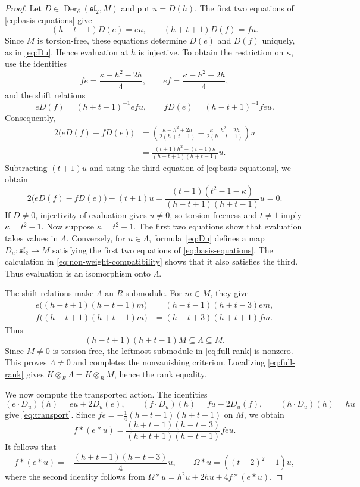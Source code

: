 \documentclass[11pt,reqno]{amsart}
\numberwithin{equation}{section}
\newcommand{\s}{\mathfrak{sl}_2}
\DeclareMathOperator{\Der}{Der}
\theoremstyle{definition}
\theoremstyle{remark}
\begin{document}
\begin{proof}
Let \(D\in\Der_\delta(\s,M)\) and put \(u=D(h)\).
The first two equations of \eqref{eq:basis-equations} give
\[
(h-t-1)D(e)=eu,\qquad (h+t+1)D(f)=fu.
\]
Since \(M\) is torsion-free, these equations determine
\(D(e)\) and \(D(f)\) uniquely, as in \eqref{eq:Du}.
Hence evaluation at \(h\) is injective. To obtain the restriction
on \(\kappa\), use the identities
\[
fe=\frac{\kappa-h^2-2h}{4},\qquad
ef=\frac{\kappa-h^2+2h}{4},
\]
and the shift relations
\[
eD(f)=(h+t-1)^{-1}efu,\qquad
fD(e)=(h-t+1)^{-1}feu.
\]
Consequently,
\[
\begin{aligned}
2\bigl(eD(f)-fD(e)\bigr)
&=\left(\frac{\kappa-h^2+2h}{2(h+t-1)}
 -\frac{\kappa-h^2-2h}{2(h-t+1)}\right)u\\
&=\frac{(t+1)h^2-(t-1)\kappa}{(h-t+1)(h+t-1)}u.
\end{aligned}
\]
Subtracting \((t+1)u\) and using the third equation of
\eqref{eq:basis-equations}, we obtain
\begin{equation}\label{eq:non-weight-compatibility}
2\bigl(eD(f)-fD(e)\bigr)-(t+1)u
=\frac{(t-1)(t^2-1-\kappa)}{(h-t+1)(h+t-1)}u=0.
\end{equation}
If \(D\ne0\), injectivity of evaluation gives \(u\ne0\),
so torsion-freeness and \(t\ne1\) imply \(\kappa=t^2-1\).
Now suppose \(\kappa=t^2-1\). The first two equations show that
evaluation takes values in \(\Lambda\). Conversely, for \(u\in\Lambda\),
formula~\eqref{eq:Du} defines a map \(D_u:\s\to M\) satisfying
the first two equations of \eqref{eq:basis-equations}.
The calculation in \eqref{eq:non-weight-compatibility} shows that
it also satisfies the third. Thus evaluation is an isomorphism
onto \(\Lambda\).

The shift relations make \(\Lambda\) an \(R\)-submodule.
For \(m\in M\), they give
\[
\begin{aligned}
e\bigl((h-t+1)(h+t-1)m\bigr)&=(h-t-1)(h+t-3)em,\\
f\bigl((h-t+1)(h+t-1)m\bigr)&=(h-t+3)(h+t+1)fm.
\end{aligned}
\]
Thus
\begin{equation}\label{eq:full-rank}
(h-t+1)(h+t-1)M\subseteq\Lambda\subseteq M.
\end{equation}
Since \(M\ne0\) is torsion-free, the leftmost submodule in
\eqref{eq:full-rank} is nonzero. This proves \(\Lambda\ne0\) and
completes the nonvanishing criterion. Localizing
\eqref{eq:full-rank} gives
\(K\otimes_R\Lambda=K\otimes_R M\), hence the rank equality.

We now compute the transported action. The identities
\[
(e\cdot D_u)(h)=eu+2D_u(e),\qquad
(f\cdot D_u)(h)=fu-2D_u(f),\qquad
(h\cdot D_u)(h)=hu
\]
give \eqref{eq:transport}. Since
\(fe=-\frac{1}{4}(h-t+1)(h+t+1)\) on \(M\), we obtain
\[
f*(e*u)
=\frac{(h+t-1)(h-t+3)}{(h+t+1)(h-t+1)}feu.
\]
It follows that
\begin{equation}\label{eq:non-weight-target-casimir}
f*(e*u)=-\frac{(h+t-1)(h-t+3)}{4}u,\qquad
\Omega*u=((t-2)^2-1)u,
\end{equation}
where the second identity follows from
\(\Omega*u=h^2u+2hu+4f*(e*u)\).
\end{proof}
\end{document}
